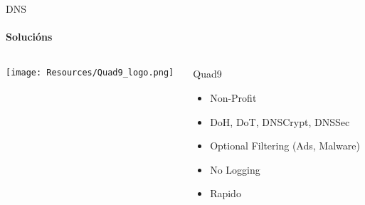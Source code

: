 \documentclass{beamer}
\begin{document}

\begin{frame}{DNS}
  \framesubtitle{Solucións}

  \begin{columns}
    \begin{column}{0.5\textwidth}
      \texttt{[image: Resources/Quad9\_logo.png]}

      \vspace{1cm}


    \end{column}

    \begin{column}{0.4\textwidth}
      \begin{block}{Quad9}
        \begin{itemize}
          \item Non-Profit
          \item DoH, DoT, DNSCrypt, DNSSec
          \item Optional Filtering (Ads, Malware)
          \item No Logging
          \item Rapido
        \end{itemize}
      \end{block}

    \end{column}

  \end{columns}


\end{frame}

\end{document}
